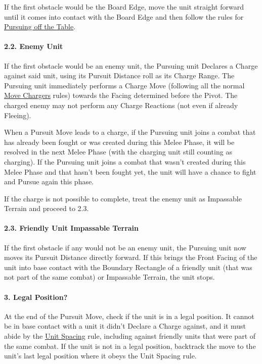 If the first obstacle would be the Board Edge, move the unit straight forward until it comes into contact with the Board Edge and then follow the rules for \hyperref[pursuing_off_the_table]{Pursuing off the Table}.

\paragraph{2.2. Enemy Unit}

If the first obstacle would be an enemy unit, the Pursuing unit Declares a Charge against said unit, using its Pursuit Distance roll as its Charge Range. The Pursuing unit immediately performs a Charge Move (following all the normal \hyperref[move_chargers]{Move Chargers} rules) towards the Facing determined before the Pivot. The charged enemy may not perform any Charge Reactions (not even if already Fleeing).
\par
When a Pursuit Move leads to a charge, if the Pursuing unit joins a combat that has already been fought or was created during this Melee Phase, it will be resolved in the next Melee Phase (with the charging unit still counting as charging). If the Pursuing unit joins a combat that wasn't created during this Melee Phase and that hasn't been fought yet, the unit will have a chance to fight and Pursue again this phase.
\par
If the charge is not possible to complete, treat the enemy unit as Impassable Terrain and proceed to 2.3.

\paragraph{2.3. Friendly Unit\rewordedrule{,} Impassable Terrain}

If the first obstacle\rewordedrule{,} \removedreworded{(}if any\removedreworded{)}\rewordedrule{,} would not be an enemy unit, the Pursuing unit now moves its Pursuit Distance directly forward. If this brings the Front Facing of the unit into base contact with the Boundary Rectangle of a friendly unit (that was not part of the same combat) or Impassable Terrain, the unit stops.

\paragraph{3. Legal Position?}

At the end of the Pursuit Move, check if the unit is in a legal position. It cannot be in base contact with a unit it didn't Declare a Charge against, and it must abide by the \hyperref[unit_spacing]{Unit Spacing} rule, including against friendly units that were part of the same combat. If the unit is not in a legal position, backtrack the move to the unit's last legal position where it obeys the Unit Spacing rule.

